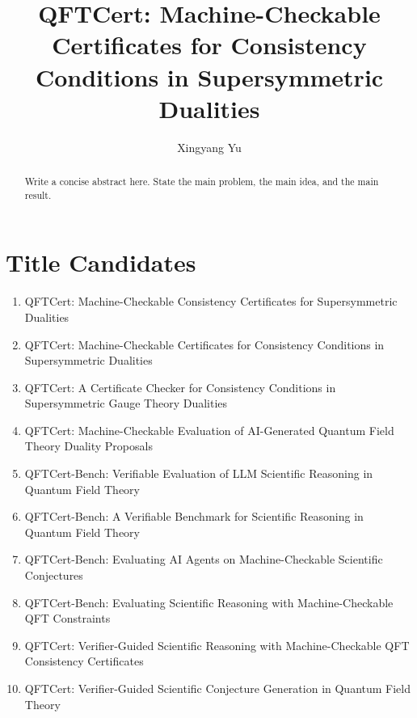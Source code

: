 \documentclass[11pt]{scrartcl}
\title{QFTCert: Machine-Checkable Certificates for Consistency Conditions in Supersymmetric Dualities}
\author[1]{Xingyang Yu}
\affil[1]{Department of Physics, Virginia Tech, Blacksburg, VA 24061, USA}
\begin{document}
\maketitle

\begin{abstract}
Write a concise abstract here. State the main problem, the main idea, and the main result.
\end{abstract}

\newpage
\tableofcontents

\section{Title Candidates}


\begin{enumerate}
    \item QFTCert: Machine-Checkable Consistency Certificates for Supersymmetric Dualities

    \item QFTCert: Machine-Checkable Certificates for Consistency Conditions in Supersymmetric Dualities

    \item QFTCert: A Certificate Checker for Consistency Conditions in Supersymmetric Gauge Theory Dualities

    \item QFTCert: Machine-Checkable Evaluation of AI-Generated Quantum Field Theory Duality Proposals

    \item QFTCert-Bench: Verifiable Evaluation of LLM Scientific Reasoning in Quantum Field Theory

    \item QFTCert-Bench: A Verifiable Benchmark for Scientific Reasoning in Quantum Field Theory

    \item QFTCert-Bench: Evaluating AI Agents on Machine-Checkable Scientific Conjectures

    \item QFTCert-Bench: Evaluating Scientific Reasoning with Machine-Checkable QFT Constraints

    \item QFTCert: Verifier-Guided Scientific Reasoning with Machine-Checkable QFT Consistency Certificates

    \item QFTCert: Verifier-Guided Scientific Conjecture Generation in Quantum Field Theory


\end{enumerate}
\end{document}
